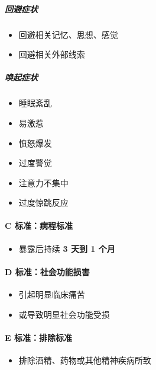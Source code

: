 \documentclass[
  chinese,
  9pt,
  a4paper,
]{ctexart}
\providecommand{\tightlist}{%
  \setlength{\itemsep}{0pt}\setlength{\parskip}{0pt}}
\begin{document}
\subparagraph{回避症状}\label{ux56deux907fux75c7ux72b6}

\begin{itemize}
\tightlist
\item
  回避相关记忆、思想、感觉
\item
  回避相关外部线索
\end{itemize}

\subparagraph{唤起症状}\label{ux5524ux8d77ux75c7ux72b6}

\begin{itemize}
\tightlist
\item
  睡眠紊乱
\item
  易激惹
\item
  愤怒爆发
\item
  过度警觉
\item
  注意力不集中
\item
  过度惊跳反应
\end{itemize}

\paragraph{C
标准：病程标准}\label{c-ux6807ux51c6ux75c5ux7a0bux6807ux51c6}

\begin{itemize}
\tightlist
\item
  暴露后持续 \textbf{3 天到 1 个月}
\end{itemize}

\paragraph{D
标准：社会功能损害}\label{d-ux6807ux51c6ux793eux4f1aux529fux80fdux635fux5bb3}

\begin{itemize}
\tightlist
\item
  引起明显临床痛苦
\item
  或导致明显社会功能受损
\end{itemize}

\paragraph{E
标准：排除标准}\label{e-ux6807ux51c6ux6392ux9664ux6807ux51c6}

\begin{itemize}
\tightlist
\item
  排除酒精、药物或其他精神疾病所致
\end{itemize}
\end{document}
